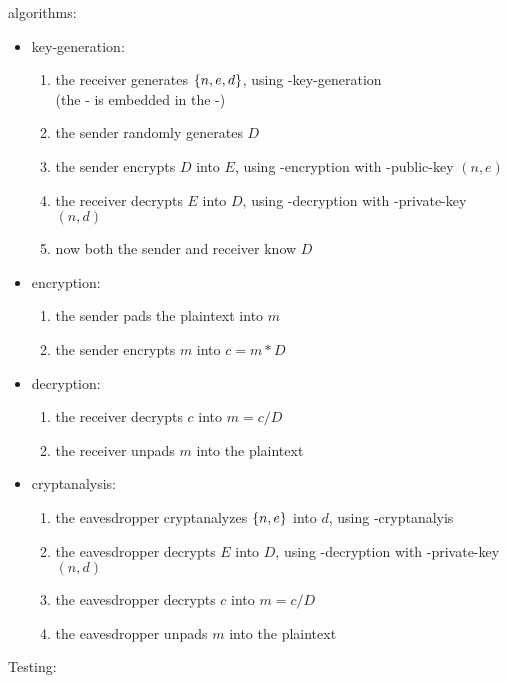 algorithms:
\begin{itemize}
\item key-generation:
  \begin{enumerate}
  \item the receiver generates $\left\{ n, e, d \right\}$,
    using \rsa-key-generation \\
    (the \rsa-\cs{} is embedded in the \dummy-\cs)
  \item the sender randomly generates $D$
  \item the sender encrypts $D$ into $E$,
    using \rsa-encryption with \rsa-public-key $(n, e)$
  \item the receiver decrypts $E$ into $D$,
    using \rsa-decryption with \rsa-private-key $(n, d)$
  \item now both the sender and receiver know $D$
  \end{enumerate}
\item encryption:
  \begin{enumerate}
  \item the sender pads the plaintext into $m$
  \item the sender encrypts $m$ into $c = m * D$
  \end{enumerate}
\item decryption:
  \begin{enumerate}
  \item the receiver decrypts $c$ into $m = c / D$
  \item the receiver unpads $m$ into the plaintext
  \end{enumerate}
\item cryptanalysis:
  \begin{enumerate}
  \item the eavesdropper cryptanalyzes $\left\{ n, e \right\}$
    into $d$, using \rsa-cryptanalyis
  \item the eavesdropper decrypts $E$ into $D$,
    using \rsa-decryption with \rsa-private-key $(n, d)$
  \item the eavesdropper decrypts $c$ into $m = c / D$
  \item the eavesdropper unpads $m$ into the plaintext
  \end{enumerate}
\end{itemize}

Testing:
\codes{}


\subsubsection{\cry{} \cf}

\codes{}
